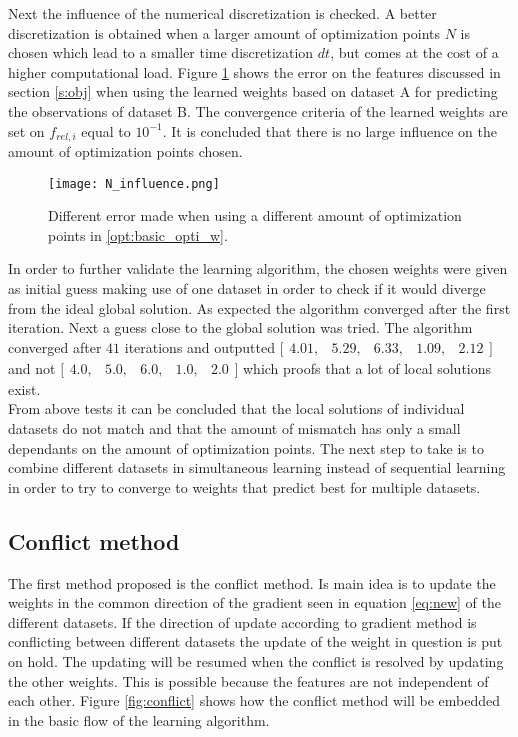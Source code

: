  Next the influence of the numerical discretization is checked. A better discretization is obtained when a larger amount of optimization points $N$ is chosen which lead to a smaller time discretization $dt$, but comes at the cost of a higher computational load. Figure \ref{fig:N_influence} shows the error on the features discussed in section \ref{s:obj} when using the learned weights based on dataset A for predicting the observations of dataset B. The convergence criteria of the learned weights are set on $f_{rel,i}$ equal to $10^{-1}$. It is concluded that there is no large influence on the amount of optimization points chosen.\\
 
 \begin{figure}[h!]
 	\centering
 	\texttt{[image: N\_influence.png]}
 	\caption{Different error made when using a different amount of optimization points in \ref{opt:basic_opti_w}.}
 	\label{fig:N_influence}
 \end{figure}
 
 In order to further validate the learning algorithm, the chosen weights were given as initial guess making use of one dataset in order to check if it would diverge from the ideal global solution. As expected the algorithm converged after the first iteration. Next a guess close to the global solution was tried. The algorithm converged after $41$ iterations and outputted $\bigl[ \begin{smallmatrix} 4.01,&5.29,&6.33,&1.09,&2.12\end{smallmatrix}\bigr]$ and not $\bigl[ \begin{smallmatrix} 4.0,&5.0,&6.0,&1.0,&2.0\end{smallmatrix}\bigr]$ which proofs that a lot of local solutions exist.\\  
 
 From above tests it can be concluded that the local solutions of individual datasets do not match and that the amount of mismatch has only a small dependants on the amount of optimization points. The next step to take is to combine different datasets in simultaneous learning instead of sequential learning in order to try to converge to weights that predict best for multiple datasets. 
 
 \subsection{Conflict method}
 The first method proposed is the conflict method. Is main idea is to update the weights in the common direction of the gradient seen in equation \ref{eq:new} of the different datasets. If the direction of update according to gradient method is conflicting between different datasets the update of the weight in question is put on hold. The updating will be resumed when the conflict is resolved by updating the other weights. This is possible because the features are not independent of each other. Figure \ref{fig:conflict} shows how the conflict method will be embedded in the basic flow of the learning algorithm.\\
 

